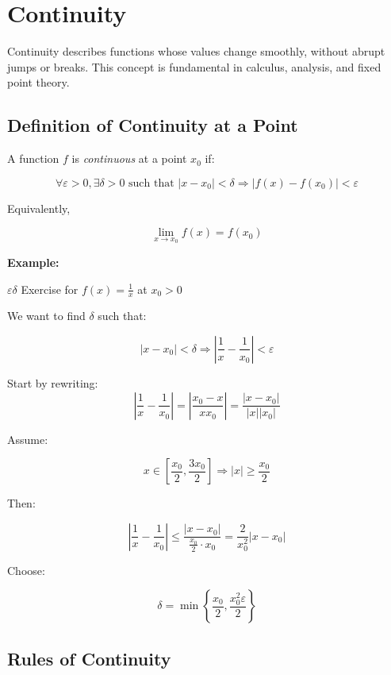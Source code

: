 \newpage
\section{Continuity}

Continuity describes functions whose values change smoothly, without abrupt jumps or breaks. 
This concept is fundamental in calculus, analysis, and fixed point theory.

\subsection{Definition of Continuity at a Point}

A function \(f\) is \emph{continuous} at a point \(x_0\) if:

\[
    \forall \varepsilon > 0, \exists \delta > 0 \text{ such that } |x - x_0| < \delta \Rightarrow |f(x) - f(x_0)| < \varepsilon
\]

Equivalently,

\[
    \lim_{x \to x_0} f(x) = f(x_0)
\]

\textbf{Example:} 
\vspace{\baselineskip}

\(\varepsilon \delta\) Exercise for \(f(x) = \frac{1}{x}\) at \(x_0 > 0\)
\vspace{\baselineskip}

We want to find \(\delta\) such that:

\[
    |x - x_0| < \delta \Rightarrow \left|\frac{1}{x} - \frac{1}{x_0}\right| < \varepsilon
\]

Start by rewriting:
\[
    \left|\frac{1}{x} - \frac{1}{x_0}\right| = \left|\frac{x_0 - x}{xx_0}\right| = \frac{|x - x_0|}{|x||x_0|}
\]

Assume:

\[
    x \in \left[\frac{x_0}{2}, \frac{3x_0}{2}\right] \Rightarrow |x| \ge \frac{x_0}{2}
\]

Then:

\[
    \left|\frac{1}{x} - \frac{1}{x_0}\right| \le \frac{|x - x_0|}{\frac{x_0}{2} \cdot x_0} = \frac{2}{x_0^2} |x - x_0|
\]

Choose:

\[
    \delta = \min\left\{\frac{x_0}{2}, \frac{x_0^2 \varepsilon}{2} \right\}
\]

\subsection{Rules of Continuity}

